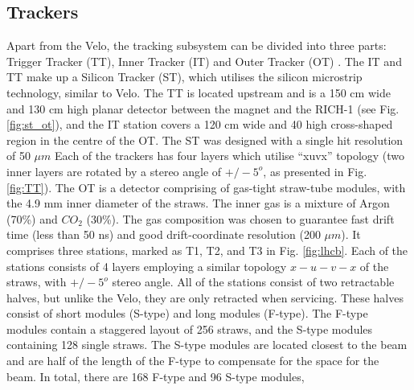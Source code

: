 \subsection{Trackers}
Apart from the Velo, the tracking subsystem can be divided into three parts: Trigger Tracker (TT), Inner Tracker (IT) and Outer Tracker (OT) \cite{Barbosa-Marinho:582793, Collaboration:1647400}.
The IT and TT make up a Silicon Tracker (ST), which utilises the silicon microstrip technology, similar to Velo.
The TT is located upstream and is a 150 cm wide and 130 cm high planar detector between the magnet and the RICH-1 (see Fig. \ref{fig:st_ot}), and the IT station covers a 120 cm wide and 40 high cross-shaped region in the centre of the OT.
The ST was designed with a single hit resolution of 50 $\mu m$
Each of the trackers has four layers which utilise ``xuvx'' topology (two inner layers are rotated by a stereo angle of $+/-5^{o}$, as presented in Fig. \ref{fig:TT}).
The OT is a detector comprising of gas-tight straw-tube modules, with the 4.9 mm inner diameter of the straws. The inner gas is a mixture of Argon (70\%) and $CO_{2}$ (30\%). The gas composition was chosen to guarantee fast drift time  (less than 50 ns) and good drift-coordinate resolution (200 $\mu m$).
It comprises three stations, marked as T1, T2, and T3 in Fig. \ref{fig:lhcb}.
Each of the stations consists of 4 layers employing a similar topology $x-u-v-x$ of the straws, with $+/-5^{o}$ stereo angle.
All of the stations consist of two retractable halves, but unlike the Velo, they are only retracted when servicing.
These halves consist of short modules (S-type) and long modules (F-type).
The F-type modules contain a staggered layout of 256 straws, and the S-type modules containing 128 single straws.
The S-type modules are located closest to the beam and are half of the length of the F-type to compensate for the space for the beam.
In total, there are 168 F-type and 96 S-type modules,

